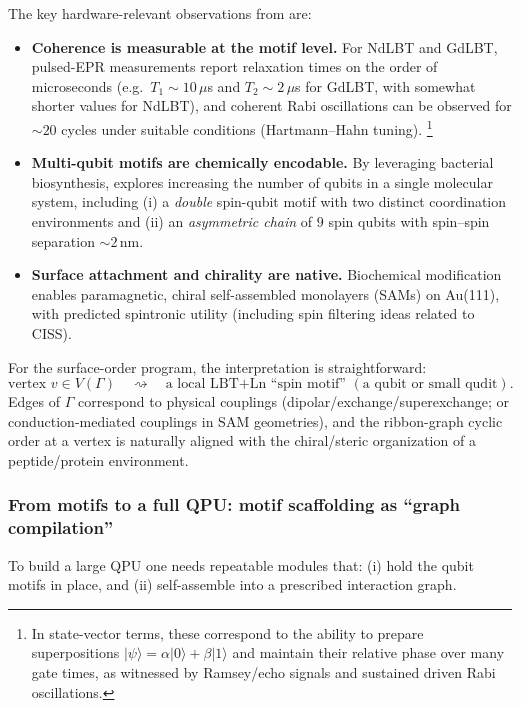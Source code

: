 \documentclass[11pt,oneside]{amsbook}
\numberwithin{equation}{section}
\theoremstyle{plain}
\theoremstyle{definition}
\theoremstyle{remark}
\newcommand{\ket}[1]{\lvert #1 \rangle}
\begin{document}
The key hardware-relevant observations from \cite{Rosaleny2017PeptideQC} are:

\begin{itemize}
\item \textbf{Coherence is measurable at the motif level.}
For NdLBT and GdLBT, pulsed-EPR measurements report relaxation times on the order of microseconds (e.g.\ $T_1\sim 10\,\mu$s and $T_2\sim 2\,\mu$s for GdLBT, with somewhat shorter values for NdLBT),
and coherent Rabi oscillations can be observed for $\sim 20$ cycles under suitable conditions (Hartmann--Hahn tuning).%
\footnote{In state-vector terms, these correspond to the ability to prepare superpositions $\ket{\psi}=\alpha\ket{0}+\beta\ket{1}$ and maintain their relative phase over many gate times, as witnessed by Ramsey/echo signals and sustained driven Rabi oscillations.}

\item \textbf{Multi-qubit motifs are chemically encodable.}
By leveraging bacterial biosynthesis, \cite{Rosaleny2017PeptideQC} explores increasing the number of qubits in a single molecular system,
including (i) a \emph{double} spin-qubit motif with two distinct coordination environments and (ii) an \emph{asymmetric chain} of $9$ spin qubits with spin--spin separation $\sim 2$\,nm.

\item \textbf{Surface attachment and chirality are native.}
Biochemical modification enables paramagnetic, chiral self-assembled monolayers (SAMs) on Au(111), with predicted spintronic utility (including spin filtering ideas related to CISS).
\end{itemize}

For the surface-order program, the interpretation is straightforward:
\[
\text{vertex }v\in V(\Gamma)\quad \rightsquigarrow \quad \text{a local LBT+Ln ``spin motif'' }(\text{a qubit or small qudit}).
\]
Edges of $\Gamma$ correspond to physical couplings (dipolar/exchange/superexchange; or conduction-mediated couplings in SAM geometries),
and the ribbon-graph cyclic order at a vertex is naturally aligned with the chiral/steric organization of a peptide/protein environment.

\subsubsection{From motifs to a full QPU: motif scaffolding as ``graph compilation''}
To build a large QPU one needs repeatable modules that:
(i) hold the qubit motifs in place, and (ii) self-assemble into a prescribed interaction graph.
\end{document}
